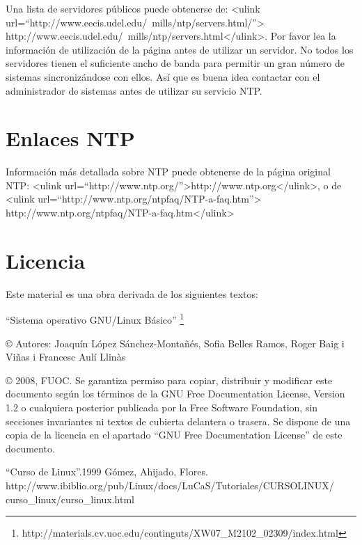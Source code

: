 \documentclass[12pt]{article}
\begin{document}
Una lista de servidores públicos puede obtenerse de:
<ulink url=``http://www.eecis.udel.edu/~mills/ntp/servers.html/''>
	http://www.eecis.udel.edu/~mills/ntp/servers.html</ulink>. Por favor lea la
información de utilización de la página antes de utilizar un servidor. No 
todos los servidores tienen el suficiente ancho de banda para permitir 
un gran número de sistemas sincronizándose con ellos. Así que es buena 
idea contactar con el administrador de sistemas antes de utilizar su 
servicio NTP.



\section{ Enlaces NTP}


Información más detallada sobre NTP puede obtenerse de la página
original NTP: <ulink url=``http://www.ntp.org/''>http://www.ntp.org</ulink>, o de
<ulink url=``http://www.ntp.org/ntpfaq/NTP-a-faq.htm''>
	http://www.ntp.org/ntpfaq/NTP-a-faq.htm</ulink>


\section{Licencia}

Este material es una obra derivada de los siguientes textos:

``Sistema operativo GNU/Linux Básico'' \footnote{http://materials.cv.uoc.edu/continguts/XW07\_M2102\_02309/index.html}

© Autores: Joaquín López Sánchez-Montañés, Sofia Belles Ramos, Roger Baig i Viñas i Francesc Aulí Llinàs

© 2008, FUOC. Se garantiza permiso para copiar, distribuir y modificar este documento según los
términos de la GNU Free Documentation License, Version 1.2 o cualquiera posterior publicada por la
Free Software Foundation, sin secciones invariantes ni textos de cubierta delantera o trasera. Se dispone
de una copia de la licencia en el apartado ``GNU Free Documentation License'' de este documento.

\begin{thebibliography}{1}
 ``Curso de Linux''.1999 Gómez, Ahijado, Flores.\\ 
http://www.ibiblio.org/pub/Linux/docs/LuCaS/Tutoriales/CURSOLINUX/\\curso\_linux/curso\_linux.html
\end{thebibliography}
\end{document}
